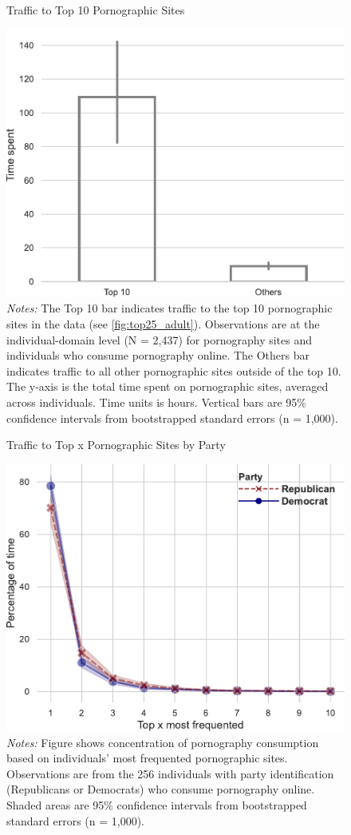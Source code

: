\documentclass[12pt, letterpaper]{article}
\begin{document}
\begin{figure}
	\centering
	\caption{Traffic to Top 10 Pornographic Sites}
	\includegraphics[width=.5\textwidth]{../figs/concentration_porn_consumption.pdf}
	\caption*{\footnotesize \emph{Notes:} 
		The Top 10 bar indicates traffic to the top 10 pornographic sites in the data (see \cref{fig:top25_adult}).
		Observations are at the individual-domain level (N = 2,437) for pornography sites and individuals who consume pornography online.
		The Others bar indicates traffic to all other pornographic sites outside of the top 10.
		The y-axis is the total time spent on pornographic sites, averaged across individuals.
		Time units is hours.
		Vertical bars are 95\% confidence intervals from bootstrapped standard errors (n = 1,000).
	}
	\label{fig:concentration_porn_consumption}
\end{figure}

\begin{figure}
	\centering
	\caption{Traffic to Top x Pornographic Sites by Party}
	\includegraphics[width=.6\textwidth]{../figs/concentration_porn_consumption_topX_by_party.pdf}
	\caption*{\footnotesize \emph{Notes:} 
		Figure shows concentration of pornography consumption based on individuals' most frequented pornographic sites.
		Observations are from the 256 individuals with party identification (Republicans or Democrats) who consume pornography online.
		Shaded areas are 95\% confidence intervals from bootstrapped standard errors (n = 1,000).
	}
	\label{fig:concentration_porn_consumption_topX_by_party}
\end{figure}
\end{document}
